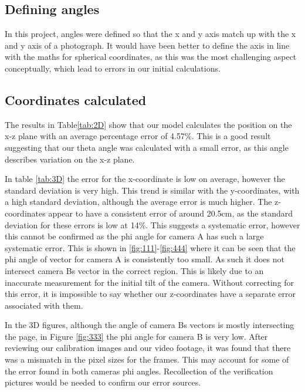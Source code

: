 \documentclass{article}
\begin{document}
\subsection{Defining angles}

In this project, angles were defined so that the x and y axis match up with the x and y axis of a photograph. It would have been better to define the axis in line with the maths for spherical coordinates, as this was the most challenging aspect conceptually, which lead to errors in our initial calculations. 

\subsection{Coordinates calculated}
The results in Table\ref{tab:2D} show that our model calculates the position on the x-z plane with an average percentage error of 4.57\%. This is a good result suggesting that our theta angle was calculated with a small error, as this angle describes variation on the x-z plane.

In table \ref{tab:3D} the error for the x-coordinate is low on average, however the standard deviation is very high. This trend is similar with the y-coordinates, with a high standard deviation, although the average error is much higher. The z-coordinates appear to have a consistent error of around 20.5cm, as the standard deviation for these errors is low at 14\%. This suggests a systematic error, however this cannot be confirmed as the phi angle for camera A has such a large systematic error. This is shown in \ref{fig:111}-\ref{fig:444} where it can be seen that the phi angle of vector for camera A is consistently too small. As such it does not intersect camera Bs vector in the correct region. This is likely due to an inaccurate measurement for the initial tilt of the camera. Without correcting for this error, it is impossible to say whether our z-coordinates have a separate error associated with them. 

In the 3D figures, although the angle of camera Bs vectors is mostly intersecting the page, in Figure \ref{fig:333} the phi angle for camera B is very low. After reviewing our calibration images and our video footage, it was found that there was a mismatch in the pixel sizes for the frames. This may account for some of the error found in both cameras phi angles. Recollection of the verification pictures would be needed to confirm our error sources. 
\end{document}
